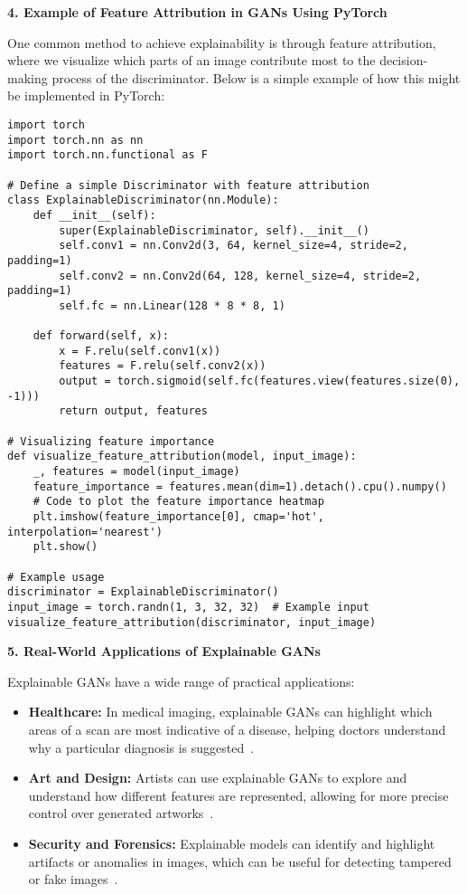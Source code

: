 \textbf{4. Example of Feature Attribution in GANs Using PyTorch}

One common method to achieve explainability is through feature attribution, where we visualize which parts of an image contribute most to the decision-making process of the discriminator. Below is a simple example of how this might be implemented in PyTorch:

\begin{lstlisting}[style=python]
import torch
import torch.nn as nn
import torch.nn.functional as F

# Define a simple Discriminator with feature attribution
class ExplainableDiscriminator(nn.Module):
    def __init__(self):
        super(ExplainableDiscriminator, self).__init__()
        self.conv1 = nn.Conv2d(3, 64, kernel_size=4, stride=2, padding=1)
        self.conv2 = nn.Conv2d(64, 128, kernel_size=4, stride=2, padding=1)
        self.fc = nn.Linear(128 * 8 * 8, 1)
    
    def forward(self, x):
        x = F.relu(self.conv1(x))
        features = F.relu(self.conv2(x))
        output = torch.sigmoid(self.fc(features.view(features.size(0), -1)))
        return output, features

# Visualizing feature importance
def visualize_feature_attribution(model, input_image):
    _, features = model(input_image)
    feature_importance = features.mean(dim=1).detach().cpu().numpy()
    # Code to plot the feature importance heatmap
    plt.imshow(feature_importance[0], cmap='hot', interpolation='nearest')
    plt.show()

# Example usage
discriminator = ExplainableDiscriminator()
input_image = torch.randn(1, 3, 32, 32)  # Example input
visualize_feature_attribution(discriminator, input_image)
\end{lstlisting}

\textbf{5. Real-World Applications of Explainable GANs}

Explainable GANs have a wide range of practical applications:
\begin{itemize}
    \item \textbf{Healthcare:} In medical imaging, explainable GANs can highlight which areas of a scan are most indicative of a disease, helping doctors understand why a particular diagnosis is suggested~\cite{li2020gan}.
    \item \textbf{Art and Design:} Artists can use explainable GANs to explore and understand how different features are represented, allowing for more precise control over generated artworks~\cite{abdal2019image2stylegan}.
    \item \textbf{Security and Forensics:} Explainable models can identify and highlight artifacts or anomalies in images, which can be useful for detecting tampered or fake images~\cite{adadi2021survey}.
\end{itemize}

